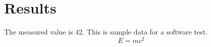 \section{Results}
The measured value is 42. This is sample data for a software test.
\begin{equation}
E = mc^2
\end{equation}
